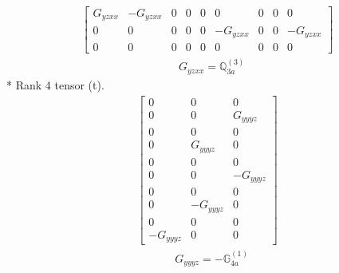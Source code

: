 \documentclass[fleqn,8pt,landscape]{jsarticle}
\begin{document}
\begin{align*}
\begin{bmatrix} G_{yzxx} & - G_{yzxx} & 0 & 0 & 0 & 0 & 0 & 0 & 0 \\ 0 & 0 & 0 & 0 & 0 & - G_{yzxx} & 0 & 0 & - G_{yzxx} \\ 0 & 0 & 0 & 0 & 0 & 0 & 0 & 0 & 0 \end{bmatrix}
\end{align*}
\begin{align*}
& G_{yzxx} = \mathbb{Q}_{3a}^{(3)}
\end{align*}
* Rank 4 tensor (t).
\begin{align*}
\begin{bmatrix} 0 & 0 & 0 \\ 0 & 0 & G_{yyyz} \\ 0 & 0 & 0 \\ 0 & G_{yyyz} & 0 \\ 0 & 0 & 0 \\ 0 & 0 & - G_{yyyz} \\ 0 & 0 & 0 \\ 0 & - G_{yyyz} & 0 \\ 0 & 0 & 0 \\ - G_{yyyz} & 0 & 0 \end{bmatrix}
\end{align*}
\begin{align*}
& G_{yyyz} = - \mathbb{G}_{4a}^{(1)}
\end{align*}
\end{document}
